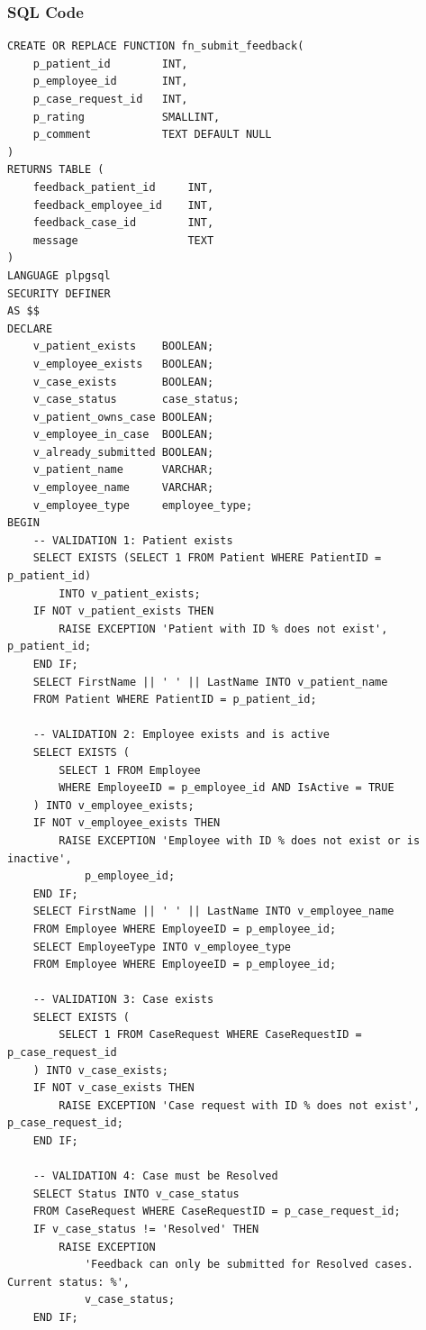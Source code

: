 \documentclass{article}
\begin{document}
\subsubsection{SQL Code}

\begin{lstlisting}
CREATE OR REPLACE FUNCTION fn_submit_feedback(
    p_patient_id        INT,
    p_employee_id       INT,
    p_case_request_id   INT,
    p_rating            SMALLINT,
    p_comment           TEXT DEFAULT NULL
)
RETURNS TABLE (
    feedback_patient_id     INT,
    feedback_employee_id    INT,
    feedback_case_id        INT,
    message                 TEXT
)
LANGUAGE plpgsql
SECURITY DEFINER
AS $$
DECLARE
    v_patient_exists    BOOLEAN;
    v_employee_exists   BOOLEAN;
    v_case_exists       BOOLEAN;
    v_case_status       case_status;
    v_patient_owns_case BOOLEAN;
    v_employee_in_case  BOOLEAN;
    v_already_submitted BOOLEAN;
    v_patient_name      VARCHAR;
    v_employee_name     VARCHAR;
    v_employee_type     employee_type;
BEGIN
    -- VALIDATION 1: Patient exists
    SELECT EXISTS (SELECT 1 FROM Patient WHERE PatientID = p_patient_id)
        INTO v_patient_exists;
    IF NOT v_patient_exists THEN
        RAISE EXCEPTION 'Patient with ID % does not exist', p_patient_id;
    END IF;
    SELECT FirstName || ' ' || LastName INTO v_patient_name
    FROM Patient WHERE PatientID = p_patient_id;

    -- VALIDATION 2: Employee exists and is active
    SELECT EXISTS (
        SELECT 1 FROM Employee
        WHERE EmployeeID = p_employee_id AND IsActive = TRUE
    ) INTO v_employee_exists;
    IF NOT v_employee_exists THEN
        RAISE EXCEPTION 'Employee with ID % does not exist or is inactive',
            p_employee_id;
    END IF;
    SELECT FirstName || ' ' || LastName INTO v_employee_name
    FROM Employee WHERE EmployeeID = p_employee_id;
    SELECT EmployeeType INTO v_employee_type
    FROM Employee WHERE EmployeeID = p_employee_id;

    -- VALIDATION 3: Case exists
    SELECT EXISTS (
        SELECT 1 FROM CaseRequest WHERE CaseRequestID = p_case_request_id
    ) INTO v_case_exists;
    IF NOT v_case_exists THEN
        RAISE EXCEPTION 'Case request with ID % does not exist', p_case_request_id;
    END IF;

    -- VALIDATION 4: Case must be Resolved
    SELECT Status INTO v_case_status
    FROM CaseRequest WHERE CaseRequestID = p_case_request_id;
    IF v_case_status != 'Resolved' THEN
        RAISE EXCEPTION
            'Feedback can only be submitted for Resolved cases. Current status: %',
            v_case_status;
    END IF;


\end{lstlisting}
\end{document}

